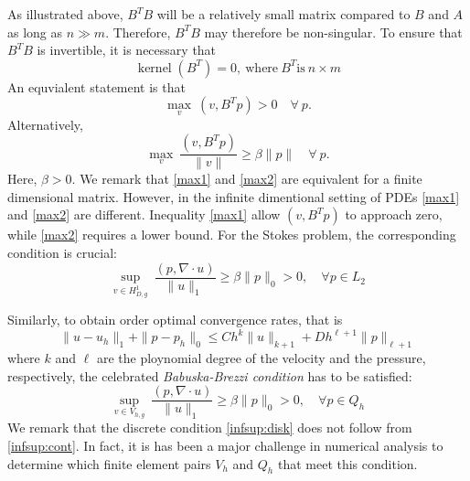 \documentclass[a4paper,11pt]{amsart}
\begin{document}
As illustrated above, $B^T B$ will be a relatively small matrix compared to
$B$ and $A$ as long as $n  \gg m$. Therefore, $B^T B$  may therefore be non-singular.
To ensure that $B^T B$ is invertible, it is necessary that
\[\operatorname{kernel}(B^T)=0,\ \textrm{where}\ B^T \textrm{is}\ n\times m\]
An equvialent statement is that
\begin{equation}
\max_v\ (v,B^Tp) > 0\quad \forall\ p .
\label{max1}
\end{equation}
Alternatively,
\begin{equation}
\max_v\ \frac{(v,B^Tp)}{\|v\| } \ge \beta \|p\| \quad \forall\ p.
\label{max2}
\end{equation}
Here, $\beta > 0$. We remark that \eqref{max1} and \eqref{max2} are equivalent for a finite dimensional matrix.
However, in the infinite dimentional setting of PDEs \eqref{max1} and \eqref{max2} are different.
Inequality \eqref{max1} allow $(v, B^T p)$ to approach zero, while \eqref{max2} requires a lower bound.
For the Stokes problem, the corresponding condition is crucial:
\begin{equation}
\sup_{v\in H^1_{D,g}}\ \frac{(p, \nabla\cdot u) }{\|u\|_1\ } \geq \beta \|p\|_0 > 0, \quad  \forall p\in L_2
\label{infsup:cont}
\end{equation}

Similarly, to obtain order optimal convergence rates, that is
\[\|u-u_h\|_1 + \|p-p_h\|_0 \leq Ch^k\|u\|_{k+1} + Dh^{\ell+1}\|p\|_{\ell+1}\]
where $k$ and $\ell$ are the ploynomial degree of the velocity and the pressure, respectively,
the celebrated \emph{Babuska-Brezzi condition} has to be satisfied:
\begin{equation}
\sup_{v\in V_{h,g}}\ \frac{(p, \nabla\cdot u) }{\|u\|_1\ } \geq \beta \|p\|_0 > 0, \quad  \forall p\in Q_h
\label{infsup:disk}
\end{equation}
We remark that the discrete condition \eqref{infsup:disk} does not follow from \eqref{infsup:cont}.
In fact, it is has been a major challenge in numerical analysis
to determine which finite element pairs $V_h$ and $Q_h$ that meet this condition.
\end{document}
